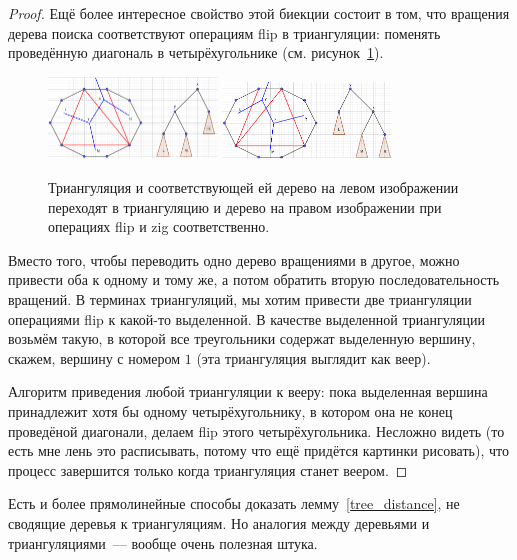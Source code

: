 \begin{proof}
Ещё более интересное свойство этой биекции состоит в том, что вращения дерева поиска соответствуют операциям \textrm{flip} в триангуляции: поменять проведённую диагональ
в четырёхугольнике (см. рисунок~\ref{rotate_and_flip}).
\begin{figure}
\includegraphics[width=0.4\textwidth]{img/before_rotation.png}
\hspace{0.1\textwidth}
\includegraphics[width=0.4\textwidth]{img/after_rotation.png}
\caption{Триангуляция и соответствующей ей дерево на левом изображении
переходят в триангуляцию и дерево на правом изображении при операциях
\textrm{flip} и \textrm{zig} соответственно.}
\label{rotate_and_flip}
\end{figure}

Вместо того, чтобы переводить одно дерево вращениями в другое, можно привести оба к одному и тому же, а потом обратить вторую последовательность вращений. В терминах триангуляций, мы хотим привести две триангуляции операциями 
\textrm{flip} к какой-то выделенной. В качестве выделенной триангуляции возьмём такую, в которой все треугольники содержат выделенную вершину, скажем, вершину с номером $1$
(эта триангуляция выглядит как веер).

Алгоритм приведения любой триангуляции к вееру: пока выделенная вершина принадлежит хотя бы одному четырёхугольнику, в котором она не конец проведёной диагонали, делаем \textrm{flip} этого четырёхугольника. Несложно видеть (то есть мне лень это расписывать, потому что ещё придётся картинки рисовать), что процесс завершится только когда триангуляция станет веером.	
\end{proof}

\begin{remark} Есть и более прямолинейные способы доказать лемму~\ref{tree_distance}, не
сводящие деревья к триангуляциям. Но аналогия между деревьями и триангуляциями~--- вообще очень полезная штука.
\end{remark}

